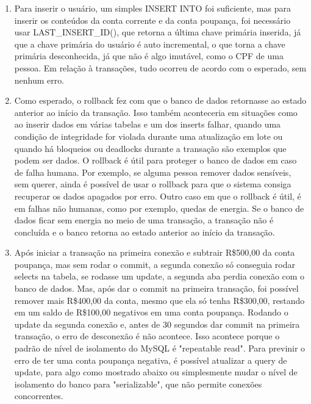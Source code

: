 \documentclass{article}
\begin{document}
\begin{enumerate}[label=\alph*)]

    \item Para inserir o usuário, um simples INSERT INTO foi suficiente, mas para inserir os conteúdos da conta corrente e da conta poupança, foi necessário usar LAST\_INSERT\_ID(), que retorna a última chave primária inserida, já que a chave primária do usuário é auto incremental, o que torna a chave primária desconhecida, já que não é algo imutável, como o CPF de uma pessoa. Em relação à transações, tudo ocorreu de acordo com o esperado, sem nenhum erro.
    
    \item Como esperado, o rollback fez com que o banco de dados retornasse ao estado anterior ao início da transação.
    \newline
    \newline
    Isso também aconteceria em situações como ao inserir dados em várias tabelas e um dos inserts falhar, quando uma condição de integridade for violada durante uma atualização em lote ou quando há bloqueios ou deadlocks durante a transação são exemplos que podem ser dados. 
    \newline
    \newline
    O rollback é útil para proteger o banco de dados em caso de falha humana. Por exemplo, se alguma pessoa remover dados sensíveis, sem querer, ainda é possível de usar o rollback para que o sistema consiga recuperar os dados apagados por erro. Outro caso em que o rollback é útil, é em falhas não humanas, como por exemplo, quedas de energia. Se o banco de dados ficar sem energia no meio de uma transação, a transação não é concluída e o banco retorna ao estado anterior ao início da transação.
    
    \item Após iniciar a transação na primeira conexão e subtrair R\$500,00 da conta poupança, mas sem rodar o commit, a segunda conexão só conseguia rodar selects na tabela, se rodasse um update, a segunda aba perdia conexão com o banco de dados. Mas, após dar o commit na primeira transação, foi possível remover mais R\$400,00 da conta, mesmo que ela só tenha R\$300,00, restando em um saldo de R\$100,00 negativos em uma conta poupança. Rodando o update da segunda conexão e, antes de 30 segundos dar commit na primeira transação, o erro de desconexão é não acontece. Isso acontece porque o padrão de nível de isolamento do MySQL é "repeatable read". Para previnir o erro de ter uma conta poupança negativa, é possível atualizar a query de update, para algo como mostrado abaixo ou simplesmente mudar o nível de isolamento do banco para "serializable", que não permite conexões concorrentes.
    

\end{enumerate}
\end{document}
